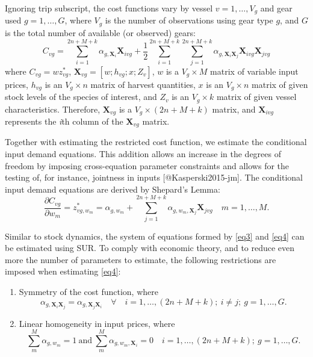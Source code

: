 Ignoring trip subscript, the cost functions vary by vessel
\(v=1,\ldots,V_g\) and gear used \(g=1,\ldots,G\), where \(V_g\) is the
number of observations using gear type \(g\), and \(G\) is the total
number of available (or observed) gears: \begin{equation}
C_{vg} = \sum_{i=1}^{2n+M+k} \alpha_{g, \mathbf{X}_i} \mathbf{X}_{ivg} + \frac{1}{2} \sum_{i=1}^{2n+M+k} \sum_{j=1}^{2n+M+k} \alpha_{g, \mathbf{X}_i\mathbf{X}_j} \mathbf{X}_{ivg} \mathbf{X}_{jvg}
\label{eq3}
\end{equation} where \(C_{vg}= w z_{vg}^*\),
\(\mathbf{X}_{vg}=[w;h_{vg};x;Z_v]\), \(w\) is a \(V_g \times M\) matrix
of variable input prices, \(h_{vg}\) is an \(V_g \times n\) matrix of
harvest quantities, \(x\) is an \(V_g \times n\) matrix of given stock
levels of the species of interest, and \(Z_v\) is an \(V_g \times k\)
matrix of given vessel characteristics. Therefore, \(\mathbf{X}_{vg}\)
is a \(V_g \times (2n+M+k)\) matrix, and \(\mathbf{X}_{ivg}\) represents
the \emph{i}th column of the \(\mathbf{X}_{vg}\) matrix.

Together with estimating the restricted cost function, we estimate the
conditional input demand equations. This addition allows an increase in
the degrees of freedom by imposing cross-equation parameter constraints
and allows for the testing of, for instance, jointness in inputs
{[}@Kasperski2015-jm{]}. The conditional input demand equations are
derived by Shepard's Lemma: \begin{equation}
\frac{\partial C_{vg}}{\partial w_m} = z^*_{vg,w_m} = \alpha_{g,w_m} + \sum_{j=1}^{2n+M+k} \alpha_{g,w_m,\mathbf{X}_j} \mathbf{X}_{jvg} \quad m=1,\ldots,M.
\label{eq4}
\end{equation}

Similar to stock dynamics, the system of equations formed by \eqref{eq3}
and \eqref{eq4} can be estimated using SUR. To comply with economic
theory, and to reduce even more the number of parameters to estimate,
the following restrictions are imposed when estimating \eqref{eq4}:

\begin{enumerate}
\def\labelenumi{\arabic{enumi}.}
\item
  Symmetry of the cost function, where \begin{equation*}
    \alpha_{g,\mathbf{X}_i\mathbf{X}_j} = \alpha_{g,\mathbf{X}_j\mathbf{X}_i} \quad \forall \quad i=1,\ldots,(2n + M + k); \ i \neq j; \ g = 1,\ldots, G.
    \end{equation*}
\item
  Linear homogeneity in input prices, where \begin{equation*}
    \sum_m^M \alpha_{g,w_m} = 1 \ \text{and} \ \sum_m^M \alpha_{g,w_m,\mathbf{X}_i} = 0 \quad i=1,\ldots,(2n + M + k); \ g = 1,\ldots, G.
    \end{equation*}
\end{enumerate}

